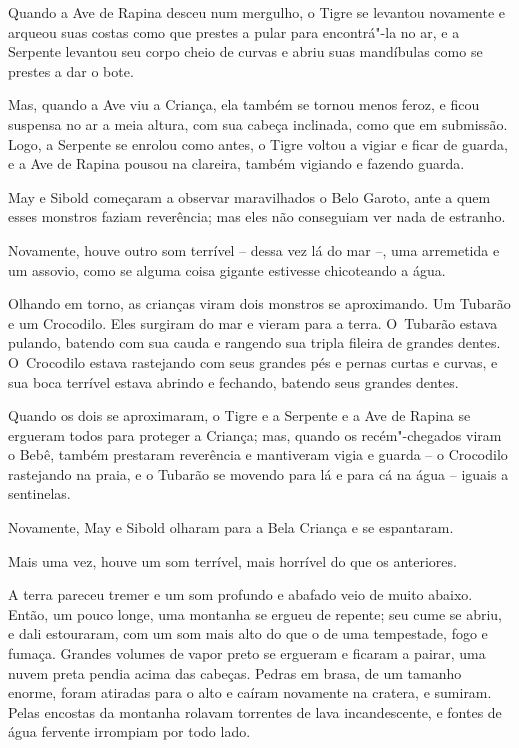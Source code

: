 Quando a Ave de Rapina desceu num mergulho, o Tigre se levantou
novamente e arqueou suas costas como que prestes a pular para
encontrá"-la no ar, e a Serpente levantou seu corpo cheio de curvas e
abriu suas mandíbulas como se prestes a dar o bote.

Mas, quando a Ave viu a Criança, ela também se tornou menos feroz, e
ficou suspensa no ar a meia altura, com sua cabeça inclinada, como que
em submissão. Logo, a Serpente se enrolou como antes, o Tigre voltou a
vigiar e ficar de guarda, e a Ave de Rapina pousou na clareira, também
vigiando e fazendo guarda.

May e Sibold começaram a observar maravilhados o Belo Garoto, ante a
quem esses monstros faziam reverência; mas eles não conseguiam ver nada
de estranho.

Novamente, houve outro som terrível -- dessa vez lá do mar --, uma
arremetida e um assovio, como se alguma coisa gigante estivesse
chicoteando a água.

Olhando em torno, as crianças viram dois monstros se aproximando. Um
Tubarão e um Crocodilo. Eles surgiram do mar e vieram para a terra. O~Tubarão estava pulando, batendo com sua cauda e rangendo sua tripla
fileira de grandes dentes. O~Crocodilo estava rastejando com seus
grandes pés e pernas curtas e curvas, e sua boca terrível estava abrindo
e fechando, batendo seus grandes dentes.

Quando os dois se aproximaram, o Tigre e a Serpente e a Ave de Rapina se
ergueram todos para proteger a Criança; mas, quando os recém"-chegados
viram o Bebê, também prestaram reverência e mantiveram vigia e guarda --
o Crocodilo rastejando na praia, e o Tubarão se movendo para lá e para
cá na água -- iguais a sentinelas.

Novamente, May e Sibold olharam para a Bela Criança e se espantaram.

Mais uma vez, houve um som terrível, mais horrível do que os anteriores.

A terra pareceu tremer e um som profundo e abafado veio de muito abaixo.
Então, um pouco longe, uma montanha se ergueu de repente; seu cume se
abriu, e dali estouraram, com um som mais alto do que o de uma
tempestade, fogo e fumaça. Grandes volumes de vapor preto se ergueram e
ficaram a pairar, uma nuvem preta pendia acima das cabeças. Pedras em
brasa, de um tamanho enorme, foram atiradas para o alto e caíram
novamente na cratera, e sumiram. Pelas encostas da montanha rolavam
torrentes de lava incandescente, e fontes de água fervente irrompiam por
todo lado.

